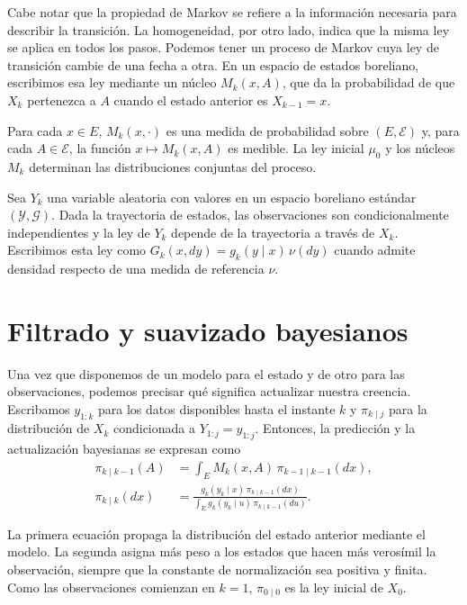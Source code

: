 Cabe notar que la propiedad de Markov se refiere a la información necesaria para describir la transición. La homogeneidad, por otro lado, indica que la misma ley se aplica en todos los pasos. Podemos tener un proceso de Markov cuya ley de transición cambie de una fecha a otra. En un espacio de estados boreliano, escribimos esa ley mediante un núcleo $M_k(x,A)$, que da la probabilidad de que $X_k$ pertenezca a $A$ cuando el estado anterior es $X_{k-1}=x$.

Para cada $x\in E$, $M_k(x,\cdot)$ es una medida de probabilidad sobre $(E,\mathcal E)$ y, para cada $A\in\mathcal E$, la función $x\mapsto M_k(x,A)$ es medible. La ley inicial $\mu_0$ y los núcleos $M_k$ determinan las distribuciones conjuntas del proceso.

Sea $Y_k$ una variable aleatoria con valores en un espacio boreliano estándar $(\mathcal Y,\mathcal G)$. Dada la trayectoria de estados, las observaciones son condicionalmente independientes y la ley de $Y_k$ depende de la trayectoria a través de $X_k$. Escribimos esta ley como $G_k(x,dy)=g_k(y\mid x)\,\nu(dy)$ cuando admite densidad respecto de una medida de referencia $\nu$.


\section{Filtrado y suavizado bayesianos}
\label{sec:filtrado-suavizado}

Una vez que disponemos de un modelo para el estado y de otro para las observaciones, podemos precisar qué significa actualizar nuestra creencia. Escribamos $y_{1:k}$ para los datos disponibles hasta el instante $k$ y $\pi_{k\mid j}$ para la distribución de $X_k$ condicionada a $Y_{1:j}=y_{1:j}$. Entonces, la predicción y la actualización bayesianas se expresan como \cite{sarkka2023}\label{cita:sarkka2023}
\begin{align}
    \pi_{k\mid k-1}(A)
        &= \int_E M_k(x,A)\,\pi_{k-1\mid k-1}(dx),\\
    \pi_{k\mid k}(dx)
        &= \frac{g_k(y_k\mid x)\,\pi_{k\mid k-1}(dx)}
        {\displaystyle \int_E g_k(y_k\mid u)\,\pi_{k\mid k-1}(du)} .
\end{align}

La primera ecuación propaga la distribución del estado anterior mediante el modelo. La segunda asigna más peso a los estados que hacen más verosímil la observación, siempre que la constante de normalización sea positiva y finita. Como las observaciones comienzan en $k=1$, $\pi_{0\mid 0}$ es la ley inicial de $X_0$.


